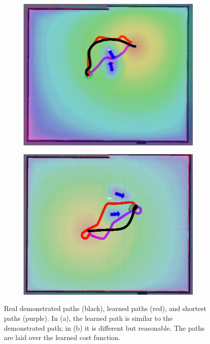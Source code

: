 \documentclass[a4paper,11pt]{report}
\begin{document}
			\begin{figure}[tbh]
	\centering
      \begin{subfigure}[b]{0.42\columnwidth}
    \includegraphics[scale=0.20]{figures/real_good_new.png}
    \caption{}
    \label{fig:res_real1}
  \end{subfigure}
  \begin{subfigure}[b]{0.42\columnwidth}
    \includegraphics[scale=0.20]{figures/real_reasonable_new.png}
    \caption{}
    \label{fig:res_real4}
  \end{subfigure} 
    \caption[Real vs learned paths]{Real demonstrated paths (black), learned paths (red), and shortest paths (purple). In (a), the learned path is similar to the demonstrated path; in (b) it is different but reasonable. The paths are laid over the learned cost function.}
  \label{fig:results_real}
  \end{figure}
\end{document}
